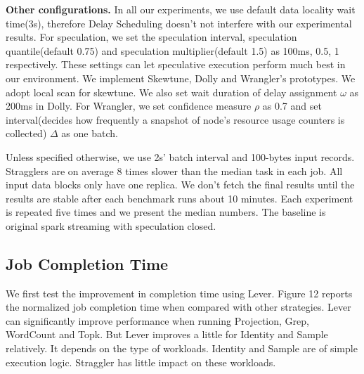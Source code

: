 \documentclass[10pt,conference,compsocconf,letterpaper]{IEEEtran}
\begin{document}
  \textbf{Other configurations.} In all our experiments, we use default data locality wait time(3s), therefore Delay Scheduling \cite{Zaharia2010B} doesn't not interfere with our experimental results. For speculation, we set the speculation interval, speculation quantile(default 0.75) and speculation multiplier(default 1.5) as 100ms, 0.5, 1 respectively. These settings can let speculative execution perform much best in our environment. We implement Skewtune, Dolly and Wrangler's prototypes. We adopt local scan for skewtune. We also set wait duration of delay assignment $\omega$ as 200ms in Dolly. For Wrangler, we set confidence measure $\rho$ as 0.7 and set interval(decides how frequently a snapshot of node's resource usage counters is collected) $\Delta$ as one batch.

  Unless specified otherwise, we use 2s' batch interval and 100-bytes input records. Stragglers are on average 8 times slower than the median task in each job. All input data blocks only have one replica. We don't fetch the final results until the results are stable after each benchmark runs about 10 minutes. Each experiment is repeated five times and we present the median numbers. The baseline is original spark streaming with speculation closed.

\subsection{Job Completion Time}

  We first test the improvement in completion time using Lever. Figure 12 reports the normalized job completion time when compared with other strategies. Lever can significantly improve performance when running Projection, Grep, WordCount and Topk. But Lever improves a little for Identity and Sample relatively. It depends on the type of workloads. Identity and Sample are of simple execution logic. Straggler has little impact on these workloads.
\end{document}
